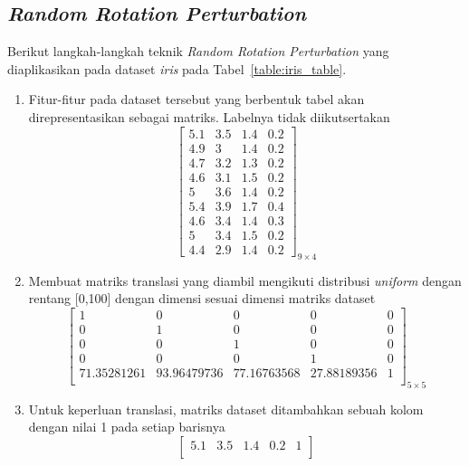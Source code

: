 \subsection{\textit{Random Rotation Perturbation}}
\label{subsec:studi-rrp}

Berikut langkah-langkah teknik \textit{Random Rotation Perturbation} yang diaplikasikan pada dataset \textit{iris} pada Tabel~\ref{table:iris_table}.
\begin{enumerate}
    \item Fitur-fitur pada dataset tersebut yang berbentuk tabel akan direpresentasikan sebagai matriks. Labelnya tidak diikutsertakan
    \[
        \begin{bmatrix}
        5.1		&		3.5		&		1.4		&		0.2	\\
        4.9		&		3		&		1.4		&		0.2	\\
        4.7		&		3.2		&		1.3		&		0.2	\\
        4.6		&		3.1		&		1.5		&		0.2	\\
        5		&		3.6		&		1.4		&		0.2	\\
        5.4		&		3.9		&		1.7		&		0.4	\\
        4.6		&		3.4		&		1.4		&		0.3	\\
        5		&		3.4		&		1.5		&		0.2	\\
        4.4		&		2.9		&		1.4		&		0.2 
        \end{bmatrix}_{9\times 4}
    \]
    \item Membuat matriks translasi yang diambil mengikuti distribusi \textit{uniform} dengan rentang [0,100] dengan dimensi sesuai dimensi matriks dataset
    \[
        \begin{bmatrix}
            1				&		0				&		0				&		0			&		0 \\
            0				&		1				&		0				&		0			&		0 \\
            0				&		0				&		1				&		0			&		0 \\
            0				&		0				&		0				&		1 			&		0 \\
            71.35281261		&		93.96479736		&		77.16763568		&		27.88189356 &		1 \\
        \end{bmatrix}_{5\times 5}
    \]
    \item Untuk keperluan translasi, matriks dataset ditambahkan sebuah kolom dengan nilai 1 pada setiap barisnya
    \[
        \begin{bmatrix}
            5.1		&		3.5		&		1.4		&		0.2		&		1 \\

\end{bmatrix}\]
\end{enumerate}
